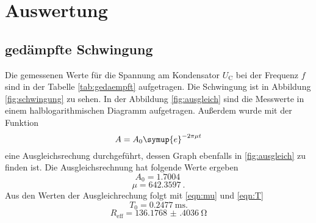 \section{Auswertung}
\label{sec:Auswertung}

\subsection{gedämpfte Schwingung}
\label{sec:gedaempft}
Die gemessenen Werte für die Spannung am Kondensator $U_\text{C}$ bei der Frequenz $f$ sind in der Tabelle \ref{tab:gedaempft} aufgetragen.
Die Schwingung ist in Abbildung \ref{fig:schwingung} zu sehen.
In der Abbildung \ref{fig:ausgleich} sind die Messwerte in einem halblogarithmischen Diagramm aufgetragen.
Außerdem wurde mit der Funktion 
\begin{equation}
    A = A_0 \symup{e}^{-2 \pi \mu t}
\end{equation}
eine Ausgleichsrechung durchgeführt, dessen Graph ebenfalls in \ref{fig:ausgleich} zu finden ist.
Die Ausgleichsrechnung hat folgende Werte ergeben
\begin{equation*}
    A_0 = \SI{1.7004}{}
\end{equation*}
\begin{equation*}
    \mu = \SI{642.3597}{}.
\end{equation*}
Aus den Werten der Ausgleichrechung folgt mit \eqref{eqn:mu} und \eqref{eqn:T}
\begin{equation*}
    T_0 = \SI{0.2477}{\milli\second}.
\end{equation*}
\begin{equation*}
    R_\text{eff} = \SI{136.1768(4036)}{\ohm}
\end{equation*}

